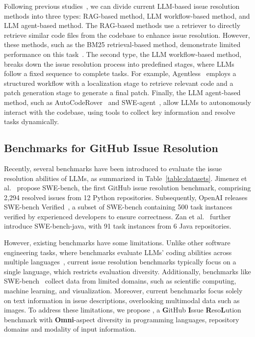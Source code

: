 Following previous studies~\cite{anthropic2024building,ouyang2024repograph,pan2024training}, we can divide current LLM-based issue resolution methods into three types: RAG-based method, LLM workflow-based method, and LLM agent-based method. The RAG-based methods use a retriever to directly retrieve similar code files from the codebase to enhance issue resolution. However, these methods, such as the BM25 retrieval-based method, demonstrate limited performance on this task~\cite{jimenez2023swe}. The second type, the LLM workflow-based method, breaks down the issue resolution process into predefined stages, where LLMs follow a fixed sequence to complete tasks. For example, Agentless~\cite{xia2024agentless} employs a structured workflow with a localization stage to retrieve relevant code and a patch generation stage to generate a final patch. Finally, the LLM agent-based method, such as AutoCodeRover~\cite{zhang2024autocoderover} and SWE-agent~\cite{yang2024swe}, allow LLMs to autonomously interact with the codebase, using tools to collect key information and resolve tasks dynamically. 

\subsection{Benchmarks for GitHub Issue Resolution}
Recently, several benchmarks have been introduced to evaluate the issue resolution abilities of LLMs, as summarized in Table~\ref{table:datasets}. Jimenez et al.~\cite{jimenez2023swe} propose SWE-bench, the first GitHub issue resolution benchmark, comprising 2,294 resolved issues from 12 Python repositories. Subsequently, OpenAI releases SWE-bench Verified~\cite{openai2024swe}, a subset of SWE-bench containing 500 task instances verified by experienced developers to ensure correctness. Zan et al.~\cite{zan2024swe} further introduce SWE-bench-java, with 91 task instances from 6 Java repositories. 

However, existing benchmarks have some limitations. Unlike other software engineering tasks, where benchmarks evaluate LLMs' coding abilities across multiple languages~\cite{zheng2023codegeex,microsoft2023multipl,TaoWSDH0ZZ21, athiwaratkun2023multilingual,zhang2023humanevalx,TaoWSDHZZZ22,yu2024codereval,yan2023codetransocean,yan2023codescope}, current issue resolution benchmarks typically focus on a single language, which restricts evaluation diversity.  Additionally, benchmarks like SWE-bench~\cite{jimenez2023swe} collect data from limited domains, such as scientific computing, machine learning, and visualization. Moreover, current benchmarks focus solely on text information in issue descriptions, overlooking multimodal data such as images. To address these limitations, we propose \textbf{\Swebenchx}, a \textbf{G}itHub \textbf{I}ssue \textbf{R}eso\textbf{L}ution benchmark with \textbf{Omni}-aspect diversity in programming languages, repository domains and modality of input information.

